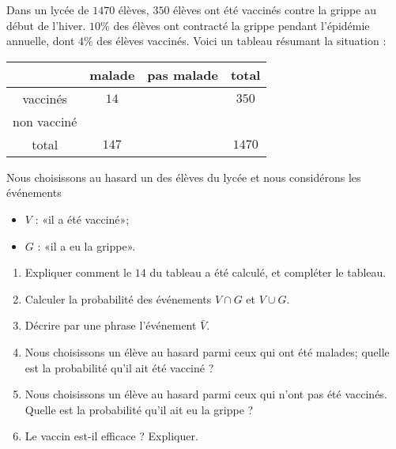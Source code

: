 

\begin{exercice}[\ldots/6]\label{exosmath-0716}

    \begin{multicols}{2}

Dans un lycée de $1470$ élèves, \( 350\) élèves ont été vaccinés contre la grippe au début de l'hiver. \( 10\%\) des élèves ont contracté la grippe pendant l'épidémie annuelle, dont \( 4\%\) des élèves vaccinés. Voici un tableau résumant la situation :

\begin{center}
    \begin{tabular}[]{|c|c|c|c|}
        \hline
        &malade&pas malade&total\\
        \hline
        vaccinés&\( 14\)&&\( 350\)\\
        \hline
        non vacciné&&&\\
        \hline
        total&\( 147\)&&\( 1470\)\\
        \hline
    \end{tabular}
\end{center}

    Nous choisissons au hasard un des élèves du lycée et nous considérons les événements 
    \begin{itemize}
        \item \( V\) : «il a été vacciné»; 
        \item \( G\) : «il a eu la grippe». 
    \end{itemize}
        

\begin{enumerate}
    \item
        Expliquer comment le \( 14\) du tableau a été calculé, et compléter le tableau.
    \item
        Calculer la probabilité des événements \( V\cap G\) et \( V\cup G\).
    \item
        Décrire par une phrase l'événement \( \bar V\).
    \item
        Nous choisissons un élève au hasard parmi ceux qui ont été malades; quelle est la probabilité qu'il ait été vacciné ?
    \item
        Nous choisissons un élève au hasard parmi ceux qui n'ont pas été vaccinés. Quelle est la probabilité qu'il ait eu la grippe ?
    \item
        Le vaccin est-il efficace ? Expliquer.
\end{enumerate}

    \end{multicols}

\end{exercice}
